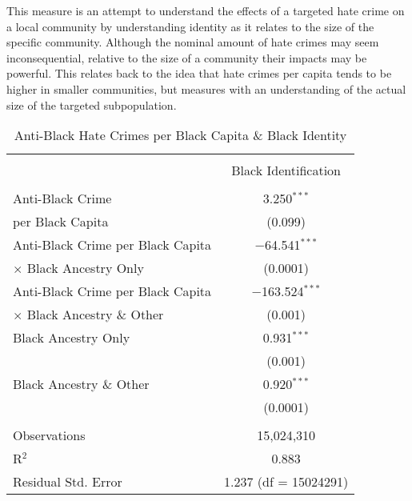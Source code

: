 \documentclass{article}
\begin{document}
    This measure is an attempt to understand the effects of a targeted hate crime on a local community by understanding identity as it relates to the size of the specific community. Although the nominal amount of hate crimes may seem inconsequential, relative to the size of a community their impacts may be powerful. This relates back to the idea that hate crimes per capita tends to be higher in smaller communities, but measures with an understanding of the actual size of the targeted subpopulation.  
    
        \begin{table}[!htbp] \centering
          \caption{Anti-Black Hate Crimes per Black Capita \& Black Identity} 
          \begin{tabular}{@{\extracolsep{5pt}}lc} 
            \\[-1.8ex]\hline 
            \hline \\[-1.8ex] 
             & \multicolumn{1}{c}{\small{Black Identification}} \\ 
            \hline \\[-1.8ex] 
             Anti-Black Crime & 3.250$^{***}$ \\
             per Black Capita & \small{(0.099)} \\     
             Anti-Black Crime per Black Capita & $-$64.541$^{***}$ \\ 
             $\times$ Black Ancestry Only & \small{(0.0001)} \\ 
             Anti-Black Crime per Black Capita   & $-$163.524$^{***}$ \\ 
             $\times$ Black Ancestry \& Other & \small{(0.001)} \\           
             Black Ancestry Only & 0.931$^{***}$ \\ 
              & \small{(0.001)} \\ 
             Black Ancestry \& Other & 0.920$^{***}$ \\ 
              & \small{(0.0001)} \\ 
            \hline \\[-1.8ex] 
            Observations & 15,024,310 \\ 
            R$^{2}$ & 0.883 \\ 
            Residual Std. Error & 1.237 (df = 15024291) \\ 
        \end{tabular} 
        \label{tab:any_anti_blkcap_yr}
        \end{table} 
        
\end{document}
